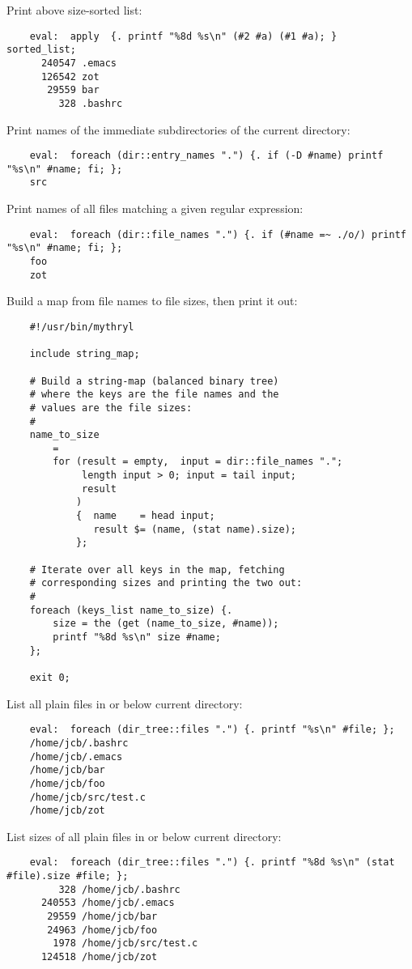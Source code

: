 Print above size-sorted list:
\begin{verbatim}
    eval:  apply  {. printf "%8d %s\n" (#2 #a) (#1 #a); }  sorted_list;
      240547 .emacs
      126542 zot
       29559 bar
         328 .bashrc
\end{verbatim}

Print names of the immediate subdirectories of the current directory:
\begin{verbatim}
    eval:  foreach (dir::entry_names ".") {. if (-D #name) printf "%s\n" #name; fi; };
    src
\end{verbatim}

Print names of all files matching a given regular expression:
\begin{verbatim}
    eval:  foreach (dir::file_names ".") {. if (#name =~ ./o/) printf "%s\n" #name; fi; };
    foo
    zot
\end{verbatim}

Build a map from file names to file sizes, then print it out:
\begin{verbatim}
    #!/usr/bin/mythryl

    include string_map;

    # Build a string-map (balanced binary tree)
    # where the keys are the file names and the
    # values are the file sizes:
    #
    name_to_size
        =
        for (result = empty,  input = dir::file_names ".";
             length input > 0; input = tail input;
             result
            )
            {  name    = head input;
               result $= (name, (stat name).size);
            };

    # Iterate over all keys in the map, fetching
    # corresponding sizes and printing the two out:
    #
    foreach (keys_list name_to_size) {.
        size = the (get (name_to_size, #name));
        printf "%8d %s\n" size #name;
    };

    exit 0;
\end{verbatim}


List all plain files in or below current directory:
\begin{verbatim}
    eval:  foreach (dir_tree::files ".") {. printf "%s\n" #file; };
    /home/jcb/.bashrc
    /home/jcb/.emacs
    /home/jcb/bar
    /home/jcb/foo
    /home/jcb/src/test.c
    /home/jcb/zot
\end{verbatim}

List sizes of all plain files in or below current directory:
\begin{verbatim}
    eval:  foreach (dir_tree::files ".") {. printf "%8d %s\n" (stat #file).size #file; };
         328 /home/jcb/.bashrc
      240553 /home/jcb/.emacs
       29559 /home/jcb/bar
       24963 /home/jcb/foo
        1978 /home/jcb/src/test.c
      124518 /home/jcb/zot
\end{verbatim}

